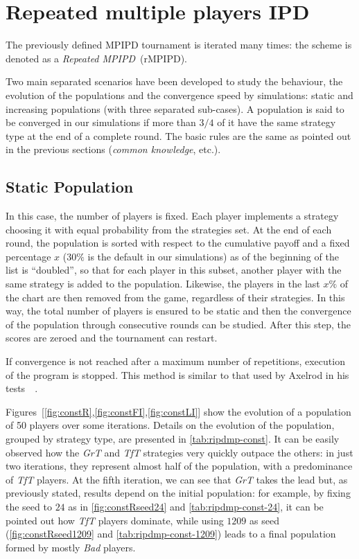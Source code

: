 \documentclass[journal,10pt,twoside]{IEEEtran}
\begin{document}
\section{Repeated multiple players IPD} \label{s:rIPDMP}
The previously defined MPIPD tournament is iterated many times: the scheme is denoted as a \textit{Repeated MPIPD}~(rMPIPD).

Two main separated scenarios have been developed to study the behaviour, the evolution of the populations and the convergence speed by simulations: static and increasing populations (with three separated sub-cases). A population is said to be converged in our simulations if more than $3/4$ of it have the same strategy type at the end of a complete round. The basic rules are the same as pointed out in the previous sections (\textit{common knowledge},  etc.).

\subsection{Static Population}
In this case, the number of players is fixed. Each player implements a strategy choosing it with equal probability from the strategies set. At the end of each round, the population is sorted with respect to the cumulative payoff and a fixed percentage $x$ ($30\%$ is the default in our simulations) as of the beginning of the list is ``doubled'', so that for each player in this subset, another player with the same strategy is added to the population. Likewise, the players in the last $x\%$ of the chart are then removed from the game, regardless of their strategies. In this way, the total number of players is ensured to be static and then the convergence of the population through consecutive rounds can be studied. After this step, the scores are zeroed and the tournament can restart.

If convergence is not reached after a maximum number of repetitions, execution of the program is stopped.
This method is similar to that used by Axelrod in his tests~\cite[\S 2.6]{mathieu2017}~\cite{axelrod1984evolution}.

Figures~[\ref{fig:constR},\ref{fig:constFI},\ref{fig:constLI}] show the evolution of a population of 50 players over some iterations.
Details on the evolution of the population, grouped by strategy type, are presented in \autoref{tab:ripdmp-const}.
It can be easily observed how the \textit{GrT} and \textit{TfT} strategies very quickly outpace the others: in just two iterations, they represent almost half of the population, with a predominance of \textit{TfT} players. At the fifth iteration, we can see that \textit{GrT} takes the lead but, as previously stated, results depend on the initial population: for example, by fixing the seed to $24$ as in \autoref{fig:constRseed24} and \autoref{tab:ripdmp-const-24}, it can be pointed out how \textit{TfT} players dominate, while using $1209$ as seed (\autoref{fig:constRseed1209} and \autoref{tab:ripdmp-const-1209}) leads to a final population formed by mostly \textit{Bad} players.
\end{document}
